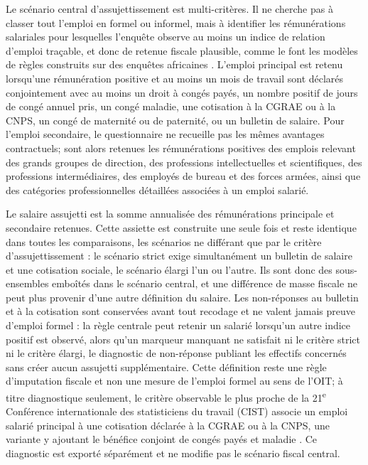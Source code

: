 \documentclass[11pt,a4paper]{article}
\begin{document}
Le scénario central d'assujettissement est multi-critères. Il ne cherche pas à
classer tout l'emploi en formel ou informel, mais à identifier les rémunérations
salariales pour lesquelles l'enquête observe au moins un indice de relation
d'emploi traçable, et donc de retenue fiscale plausible, comme le font les
modèles de règles construits sur des enquêtes africaines
\citep{decoster2019,gasior2018}. L'emploi principal est
retenu lorsqu'une rémunération positive et au moins un mois de travail sont
déclarés conjointement avec au moins un droit à congés payés, un nombre positif
de jours de congé annuel pris, un congé maladie, une cotisation à la CGRAE ou à
la CNPS, un congé de maternité ou de paternité, ou un bulletin de salaire. Pour
l'emploi secondaire, le questionnaire ne recueille pas les mêmes avantages
contractuels; sont alors retenues les rémunérations positives des emplois
relevant des grands groupes de direction, des professions intellectuelles et
scientifiques, des professions intermédiaires, des employés de bureau et des
forces armées, ainsi que des catégories professionnelles détaillées associées à
un emploi salarié.

Le salaire assujetti est la somme annualisée des rémunérations principale et
secondaire retenues. Cette assiette est construite une seule fois et reste
identique dans toutes les comparaisons, les scénarios ne différant que par le
critère d'assujettissement : le scénario strict exige simultanément un bulletin
de salaire et une cotisation sociale, le scénario élargi l'un ou l'autre. Ils
sont donc des sous-ensembles emboîtés dans le scénario central, et une différence
de masse fiscale ne peut plus provenir d'une autre définition du salaire. Les
non-réponses au bulletin et à la cotisation sont conservées avant tout recodage
et ne valent jamais preuve d'emploi formel : la règle centrale peut retenir un
salarié lorsqu'un autre indice positif est observé, alors qu'un marqueur manquant
ne satisfait ni le critère strict ni le critère élargi, le diagnostic de
non-réponse publiant les effectifs concernés sans créer aucun assujetti
supplémentaire. Cette définition reste une règle d'imputation fiscale et non
une mesure de l'emploi formel au sens de l'OIT; à titre
diagnostique seulement, le critère observable le plus proche de la
21\textsuperscript{e} Conférence internationale des statisticiens du travail
(CIST) associe un emploi salarié principal à une cotisation déclarée à la CGRAE
ou à la CNPS, une variante y ajoutant le bénéfice conjoint de congés payés et
maladie \citep{ilo2023}. Ce diagnostic est exporté séparément et ne modifie pas
le scénario fiscal central.
\end{document}
